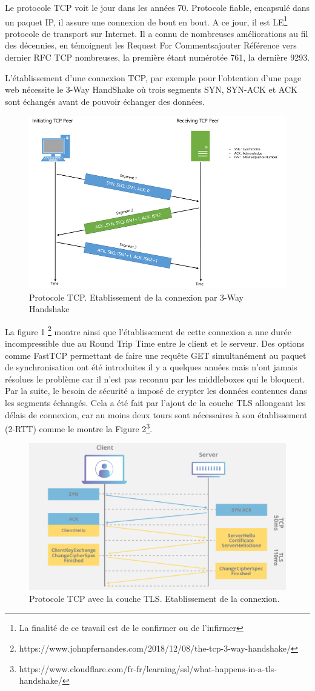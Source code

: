 \documentclass[a4paper,12pt]{article}
\begin{document}
Le protocole TCP voit le jour dans les années 70. Protocole fiable, encapsulé dans un paquet IP, il assure une connexion de bout en bout. A ce jour, il est LE\footnote{La finalité de ce travail est de le confirmer ou de l'infirmer} protocole de transport sur Internet. Il a connu de nombreuses améliorations au fil des décennies, en témoignent les Request For Comments{ajouter Référence vers dernier RFC TCP} nombreuses, la première étant numérotée 761, la dernière 9293\cite{eddy_transmission_2022}.

L'établissement d'une connexion TCP, par exemple pour l'obtention d'une page web nécessite le 3-Way HandShake où trois segments SYN, SYN-ACK et ACK sont échangés avant de pouvoir échanger des données.


\begin{figure}
    \centering
    \includegraphics[width=0.5\linewidth]{120818_0035_TheTCP3Wayh1.png}
    \caption{Protocole TCP. Etablissement de la connexion par 3-Way Handshake}
    \label{fig:3-Way Handshake}
\end{figure}

La figure 1 \footnote{https://www.johnpfernandes.com/2018/12/08/the-tcp-3-way-handshake/} montre ainsi que l'établissement de cette connexion a une durée incompressible due au Round Trip Time entre le client et le serveur. Des options comme FastTCP permettant de faire une requête GET simultanément au paquet de synchronisation ont été introduites il y a quelques années mais n'ont jamais résolues le problème car il n'est pas reconnu par les middleboxes qui le bloquent.
Par la suite, le besoin de sécurité a imposé de crypter les données contenues dans les segments échangés. Cela a été fait par l'ajout de la couche TLS allongeant les délais de connexion, car au moins deux tours sont nécessaires à son établissement (2-RTT)  comme le montre la Figure 2\footnote{https://www.cloudflare.com/fr-fr/learning/ssl/what-happens-in-a-tls-handshake/}.

\begin{figure}
    \centering
    \includegraphics[width=0.5\linewidth]{tls-ssl-handshake.png}
    \caption{Protocole TCP avec la couche TLS. Etablissement de la connexion.}
    \label{fig:`tls-ssl-handshake' }
\end{figure}
\end{document}

